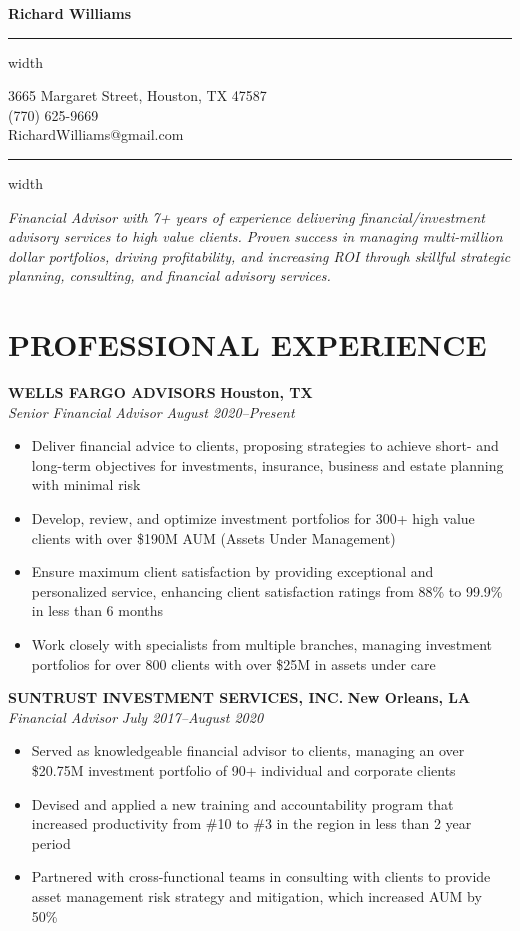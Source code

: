 \documentclass[11pt,letterpaper]{article}
\newcommand{\name}[1]{
  \begin{center}
    \Huge\textbf{#1}
  \end{center}
  \vspace{-0.5em}
  \hrule height 0.4pt width \textwidth
  \vspace{0.5em}
}
\newcommand{\contact}[3]{
  \begin{center}
    #1 \\
    #2 \\
    #3
  \end{center}
  \vspace{-0.5em}
  \hrule height 0.4pt width \textwidth
  \vspace{0.5em}
}
\newcommand{\role}[4]{
  \begin{center}
  \textbf{#1} \hfill \textbf{#2} \\
  \textit{#3} \hfill \textit{#4}
  \end{center}
}
\begin{document}
\name{Richard Williams}
\vspace{-0.5em}
\contact{3665 Margaret Street, Houston, TX 47587}{(770) 625-9669}{RichardWilliams@gmail.com}

\vspace{-0.5em}
\begin{center}
\textit{Financial Advisor with 7+ years of experience delivering financial/investment advisory services to high value clients. Proven success in managing multi-million dollar portfolios, driving profitability, and increasing ROI through skillful strategic planning, consulting, and financial advisory services.}
\end{center}

\section{PROFESSIONAL EXPERIENCE}

\vspace{1em}
\role{WELLS FARGO ADVISORS}{Houston, TX}{Senior Financial Advisor}{August 2020--Present}
\begin{itemize}[leftmargin=*,nosep]
  \item Deliver financial advice to clients, proposing strategies to achieve short- and long-term objectives for investments, insurance, business and estate planning with minimal risk
  \item Develop, review, and optimize investment portfolios for 300+ high value clients with over \$190M AUM (Assets Under Management)
  \item Ensure maximum client satisfaction by providing exceptional and personalized service, enhancing client satisfaction ratings from 88\% to 99.9\% in less than 6 months
  \item Work closely with specialists from multiple branches, managing investment portfolios for over 800 clients with over \$25M in assets under care
\end{itemize}

\role{SUNTRUST INVESTMENT SERVICES, INC.}{New Orleans, LA}{Financial Advisor}{July 2017--August 2020}
\begin{itemize}[leftmargin=*,nosep,topsep=0pt]
  \item Served as knowledgeable financial advisor to clients, managing an over \$20.75M investment portfolio of 90+ individual and corporate clients
  \item Devised and applied a new training and accountability program that increased productivity from \#10 to \#3 in the region in less than 2 year period
  \item Partnered with cross-functional teams in consulting with clients to provide asset management risk strategy and mitigation, which increased AUM by 50\%
\end{itemize}
\end{document}
